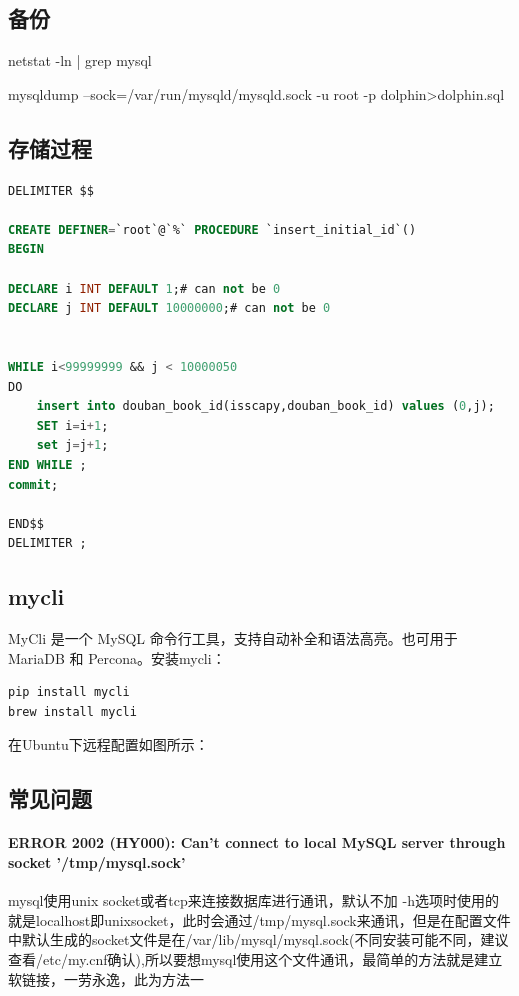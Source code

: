 \documentclass[letter]{book}
\begin{document}
\subsection{备份}

netstat -ln | grep mysql

mysqldump --sock=/var/run/mysqld/mysqld.sock -u root -p dolphin>dolphin.sql

\subsection{存储过程}

\begin{lstlisting}[language=SQL]
DELIMITER $$

CREATE DEFINER=`root`@`%` PROCEDURE `insert_initial_id`()
BEGIN  

DECLARE i INT DEFAULT 1;# can not be 0  
DECLARE j INT DEFAULT 10000000;# can not be 0  


WHILE i<99999999 && j < 10000050
DO  
	insert into douban_book_id(isscapy,douban_book_id) values (0,j);  
	SET i=i+1;  
	set j=j+1;
END WHILE ;  
commit;  

END$$
DELIMITER ;
\end{lstlisting}


\subsection{mycli}

MyCli 是一个 MySQL 命令行工具，支持自动补全和语法高亮。也可用于 MariaDB 和 Percona。安装mycli：

\begin{lstlisting}[language=Bash]
pip install mycli
brew install mycli
\end{lstlisting}

在Ubuntu下远程配置如图\label{raspberryremtoeconfig}所示：

\subsection{常见问题}

\paragraph{ERROR 2002 (HY000): Can't connect to local MySQL server through socket '/tmp/mysql.sock'}

mysql使用unix socket或者tcp来连接数据库进行通讯，默认不加 -h选项时使用的就是localhost即unixsocket，此时会通过/tmp/mysql.sock来通讯，但是在配置文件中默认生成的socket文件是在/var/lib/mysql/mysql.sock(不同安装可能不同，建议查看/etc/my.cnf确认),所以要想mysql使用这个文件通讯，最简单的方法就是建立软链接，一劳永逸，此为方法一
\end{document}

